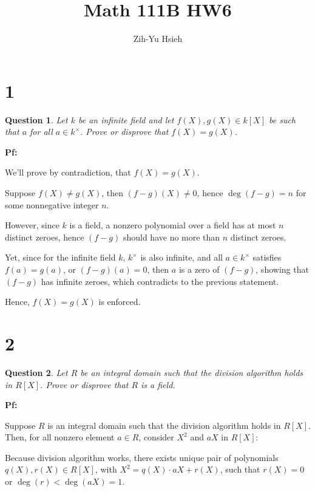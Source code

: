 \documentclass{article}
\title{Math 111B HW6}
\author{Zih-Yu Hsieh}
\newtheorem{question}{Question}
\begin{document}
\maketitle

\section*{1}
\begin{myBox}[]{}
    \begin{question}
        Let $k$ be an infinite field and let $f (X), g(X) \in k[X]$ be such that $a$ for
        all $a\in k^\times$. Prove or disprove that $f (X) = g(X)$.
    \end{question}
\end{myBox}

\textbf{Pf:}

We'll prove by contradiction, that $f(X)=g(X)$.

Suppose $f(X)\neq g(X)$, then $(f-g)(X)\neq 0$, hence $\deg(f-g)=n$ for some nonnegative integer $n$.

However, since $k$ is a field, a nonzero polynomial over a field has at most $n$ distinct zeroes, hence $(f-g)$ should have no more than $n$ distinct zeroes.

Yet, since for the infinite field $k$, $k^\times$ is also infinite, and all $a\in k^\times$ satisfies $f(a)=g(a)$, or $(f-g)(a)=0$, then $a$ is a zero of $(f-g)$,
showing that $(f-g)$ has infinite zeroes, which contradicts to the previous statement.

Hence, $f(X)=g(X)$ is enforced.

\hfill

\hfill

\section*{2}
\begin{myBox}[]{}
    \begin{question}
        Let $R$ be an integral domain such that the division algorithm holds in $R[X]$. Prove
        or disprove that $R$ is a field.  
    \end{question}
\end{myBox}

\textbf{Pf:}

Suppose $R$ is an integral domain such that the division algorithm holds in $R[X]$. Then, for all nonzero element $a\in R$,
consider $X^2$ and $aX$ in $R[X]$:

Because division algorithm works, there exists unique pair of polynomials $q(X),r(X)\in R[X]$, with $X^2 = q(X)\cdot aX + r(X)$, such that $r(X)=0$ or $\deg(r)<\deg(aX)=1$.
\end{document}
